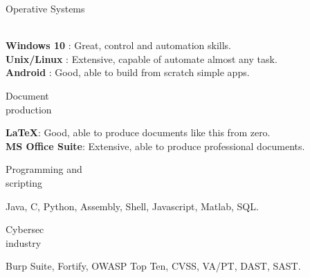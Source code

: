 \begin{minipage}{.3\textwidth}
	\flushright Operative Systems \\ \faWindows \ \faLinux \ \faApple \ \faAndroid
\end{minipage}
\hfill
\begin{minipage}{.65\textwidth}
	\vfill
	\textbf{Windows 10} \faWindows : Great, control and automation skills. 
	\\
	\textbf{Unix/Linux} \faLinux : Extensive, capable of automate almost any task.
	\\
	\textbf{Android} \faAndroid : Good, able to build from scratch simple apps.  
	\vfill
\end{minipage}

\bigskip

\begin{minipage}{.3\textwidth}
	\flushright Document \\ production \faBook 
\end{minipage}
\hfill
\begin{minipage}{.65\textwidth}
	\vfill
	\textbf{\LaTeX}: Good, able to produce documents like this from zero.
	\\
	\textbf{MS Office Suite}: Extensive, able to produce professional documents.
	\vfill
\end{minipage}

\bigskip

\begin{minipage}{.3\textwidth}
	\flushright Programming and \\ scripting \faTerminal
\end{minipage}
\hfill
\begin{minipage}{.65\textwidth}
	\vfill
	Java, C, Python, Assembly, Shell, Javascript, Matlab, SQL. 
	\vfill
\end{minipage}

\bigskip

\begin{minipage}{.3\textwidth}
	\flushright Cybersec \\ industry \faExpeditedssl
\end{minipage}
\hfill
\begin{minipage}{.64\textwidth}
	\vfill
	Burp Suite, Fortify, OWASP Top Ten, CVSS, VA/PT, DAST, SAST.
	\vfill
\end{minipage}